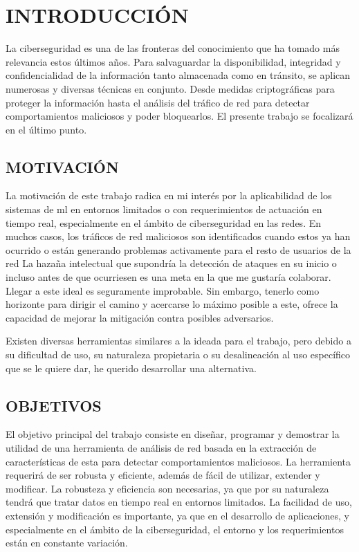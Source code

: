 \newpage
\pagestyle{plain}

\chapter*{INTRODUCCIÓN}

La ciberseguridad es una de las fronteras del conocimiento que ha tomado más relevancia estos últimos años. Para salvaguardar la disponibilidad, integridad y confidencialidad de la información tanto almacenada como en tránsito, se aplican numerosas y diversas técnicas en conjunto. Desde medidas criptográficas para proteger la información hasta el análisis del tráfico de red para detectar comportamientos maliciosos y poder bloquearlos. El presente trabajo se focalizará en el último punto.

\section*{MOTIVACIÓN}

La motivación de este trabajo radica en mi interés por la aplicabilidad de los sistemas de \gls{ml} en entornos limitados o con requerimientos de actuación en tiempo real, especialmente en el ámbito de ciberseguridad en las redes. En muchos casos, los tráficos de red maliciosos son identificados cuando estos ya han ocurrido o están generando problemas activamente para el resto de usuarios de la red La hazaña intelectual que supondría la detección de ataques en su inicio o incluso antes de que ocurriesen es una meta en la que me gustaría colaborar. Llegar a este ideal es seguramente improbable. Sin embargo, tenerlo como horizonte para dirigir el camino y acercarse lo máximo posible a este, ofrece la capacidad de mejorar la mitigación contra posibles adversarios.

Existen diversas herramientas similares a la ideada para el trabajo, pero debido a su dificultad de uso, su naturaleza propietaria o su desalineación al uso específico que se le quiere dar, he querido desarrollar una alternativa.

\section*{OBJETIVOS}

El objetivo principal del trabajo consiste en diseñar, programar y demostrar la utilidad de una herramienta de análisis de red basada en la extracción de características de esta para detectar comportamientos maliciosos. La herramienta requerirá de ser robusta y eficiente, además de fácil de utilizar, extender y modificar. La robusteza y eficiencia son necesarias, ya que por su naturaleza tendrá que tratar datos en tiempo real en entornos limitados. La facilidad de uso, extensión y modificación es importante, ya que en el desarrollo de aplicaciones, y especialmente en el ámbito de la ciberseguridad, el entorno y los requerimientos están en constante variación.

